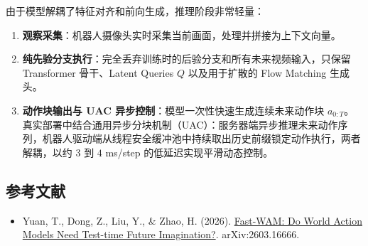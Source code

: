 由于模型解耦了特征对齐和前向生成，推理阶段非常轻量：

\begin{enumerate}
\def\labelenumi{\arabic{enumi}.}
\tightlist
\item
  \textbf{观察采集}：机器人摄像头实时采集当前画面，处理并拼接为上下文向量。
\item
  \textbf{纯先验分支执行}：完全丢弃训练时的后验分支和所有未来视频输入，只保留 Transformer 骨干、Latent Queries \(Q\) 以及用于扩散的 Flow Matching 生成头。
\item
  \textbf{动作块输出与 UAC 异步控制}：模型一次性快速生成连续未来动作块 \(a_{0:T}\)。真实部署中结合通用异步分块机制（UAC）：服务器端异步推理未来动作序列，机器人驱动端从线程安全缓冲池中持续取出历史前缀锁定动作执行，两者解耦，以约 \(3\) 到 \(4\) ms/step 的低延迟实现平滑动态控制。
\end{enumerate}

\hypertarget{ux53c2ux8003ux6587ux732e-207}{%
\subsection{参考文献}\label{ux53c2ux8003ux6587ux732e-207}}

\begin{itemize}
\tightlist
\item
  Yuan, T., Dong, Z., Liu, Y., \& Zhao, H. (2026). \href{https://arxiv.org/abs/2603.16666}{Fast-WAM: Do World Action Models Need Test-time Future Imagination?}. arXiv:2603.16666.
\end{itemize}

\clearpage

